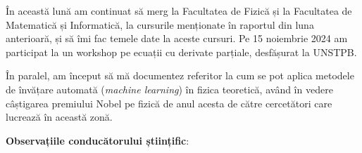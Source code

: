 
\makereportpreamble

În această lună am continuat să merg la Facultatea de Fizică și la Facultatea de Matematică și Informatică, la cursurile menționate în raportul din luna anterioară, și să îmi fac temele date la aceste cursuri. Pe 15 noiembrie 2024 am participat la un workshop pe ecuații cu derivate parțiale, desfășurat la UNSTPB.

În paralel, am început să mă documentez referitor la cum se pot aplica metodele de învățare automată (\textit{machine learning}) în fizica teoretică, având în vedere câștigarea premiului Nobel pe fizică de anul acesta de către cercetători care lucrează în această zonă.

\vspace{0.5em}

\textbf{Observațiile conducătorului științific}:

\vspace{3em}

